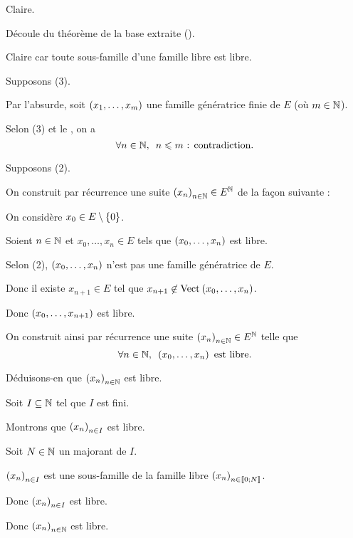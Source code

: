 \begin{dem}[(2) \(\imp\) (1)]
Claire.
\end{dem}

\begin{dem}[(1) \(\imp\) (2)]
Découle du théorème de la base extraite ().
\end{dem}

\begin{dem}[(4) \(\imp\) (3)]
Claire car toute sous-famille d'une famille libre est libre.
\end{dem}

\begin{dem}[(3) \(\imp\) (2)]
Supposons (3).

Par l'absurde, soit \(\left(x_1,\dots,x_m\right)\) une famille génératrice finie de \(E\) (où \(m\in\mathbb{N}\)).

Selon (3) et le , on a \[\quantifs{\forall n\in\N}n\leq m\text{ : contradiction}.\]
\end{dem}

\begin{dem}[(2) \(\imp\) (4)]
Supposons (2).

On construit par récurrence une suite \(\left(x_n\right)_{n\in\mathbb{N}}\in E^{\mathbb{N}}\) de la façon suivante :

On considère \(x_0\in E\setminus\left\lbrace0\right\rbrace\).

Soient \(n\in\mathbb{N}\) et \(x_0,\dots,x_n\in E\) tels que \(\left(x_0,\dots,x_n\right)\) est libre.

Selon (2), \(\left(x_0,\dots,x_n\right)\) n'est pas une famille génératrice de \(E\).

Donc il existe \(x_{n+1}\in E\) tel que \(x_{n+1}\not\in\Vect{x_0,\dots,x_n}\).

Donc \(\left(x_0,\dots,x_{n+1}\right)\) est libre.

On construit ainsi par récurrence une suite \(\left(x_n\right)_{n\in\mathbb{N}}\in E^{\mathbb{N}}\) telle que \[\quantifs{\forall n\in\N}\paren{x_0,\dots,x_n}\text{ est libre}.\]

Déduisons-en que \(\left(x_n\right)_{n\in\mathbb{N}}\) est libre.

Soit \(I\subseteq\mathbb{N}\) tel que \(I\) est fini.

Montrons que \(\left(x_n\right)_{n\in I}\) est libre.

Soit \(N\in\mathbb{N}\) un majorant de \(I\).

\(\left(x_n\right)_{n\in I}\) est une sous-famille de la famille libre \(\left(x_n\right)_{n\in\left\llbracket0;N\right\rrbracket}\).

Donc \(\left(x_n\right)_{n\in I}\) est libre.

Donc \(\left(x_n\right)_{n\in\mathbb{N}}\) est libre.
\end{dem}

